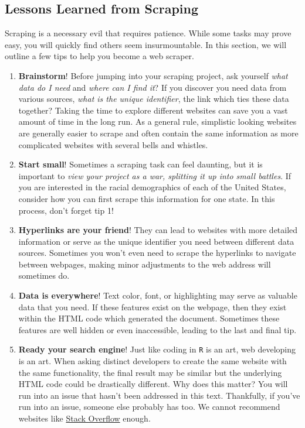 \documentclass[
]{article}
\begin{document}
\hypertarget{LessonsLearnedFromScraping}{%
\subsection{Lessons Learned from Scraping}\label{LessonsLearnedFromScraping}}

Scraping is a necessary evil that requires patience. While some tasks may prove easy, you will quickly find others seem insurmountable. In this section, we will outline a few tips to help you become a web scraper.

\begin{enumerate}
\def\labelenumi{\arabic{enumi}.}
\item
  \textbf{Brainstorm}! Before jumping into your scraping project, ask yourself \emph{what data do I need} and \emph{where can I find it}? If you discover you need data from various sources, \emph{what is the unique identifier}, the link which ties these data together? Taking the time to explore different websites can save you a vast amount of time in the long run. As a general rule, simplistic looking websites are generally easier to scrape and often contain the same information as more complicated websites with several bells and whistles.
\item
  \textbf{Start small}! Sometimes a scraping task can feel daunting, but it is important to \emph{view your project as a war, splitting it up into small battles}. If you are interested in the racial demographics of each of the United States, consider how you can first scrape this information for one state. In this process, don't forget tip 1!
\item
  \textbf{Hyperlinks are your friend}! They can lead to websites with more detailed information or serve as the unique identifier you need between different data sources. Sometimes you won't even need to scrape the hyperlinks to navigate between webpages, making minor adjustments to the web address will sometimes do.
\item
  \textbf{Data is everywhere}! Text color, font, or highlighting may serve as valuable data that you need. If these features exist on the webpage, then they exist within the HTML code which generated the document. Sometimes these features are well hidden or even inaccessible, leading to the last and final tip.
\item
  \textbf{Ready your search engine}! Just like coding in \texttt{R} is an art, web developing is an art. When asking distinct developers to create the same website with the same functionality, the final result may be similar but the underlying HTML code could be drastically different. Why does this matter? You will run into an issue that hasn't been addressed in this text. Thankfully, if you've run into an issue, someone else probably has too. We cannot recommend websites like \href{https://stackoverflow.com/}{Stack Overflow} enough.
\end{enumerate}
\end{document}
